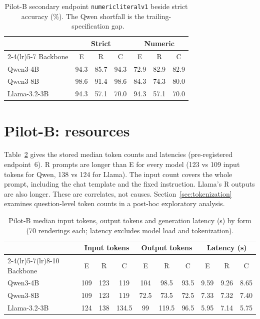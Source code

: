 \documentclass[12pt,a4paper,oneside]{report}
\renewcommand{\_}{\oldunderscore\allowbreak}
\newcommand{\rs}{\rupee}
\begin{document}
\begin{table}[t]
\centering\small
\caption{Pilot-B secondary endpoint \texttt{numeric\_literal\_v1} beside strict accuracy (\%). The Qwen shortfall is the trailing-\rs\ specification gap.}
\label{tab:numeric}
\begin{tabular}{@{}lcccccc@{}}
\toprule
 & \multicolumn{3}{c}{Strict} & \multicolumn{3}{c}{Numeric}\\
\cmidrule(lr){2-4}\cmidrule(lr){5-7}
Backbone & E & R & C & E & R & C\\
\midrule
Qwen3-4B & 94.3 & 85.7 & 94.3 & 72.9 & 82.9 & 82.9\\
Qwen3-8B & 98.6 & 91.4 & 98.6 & 84.3 & 74.3 & 80.0\\
Llama-3.2-3B & 94.3 & 57.1 & 70.0 & 94.3 & 57.1 & 70.0\\
\bottomrule
\end{tabular}
\end{table}

\section{Pilot-B: resources}

Table~\ref{tab:resources} gives the stored median token counts and latencies (pre-registered endpoint~6). R prompts are longer than E for every model (123 vs 109 input tokens for Qwen, 138 vs 124 for Llama). The input count covers the whole prompt, including the chat template and the fixed instruction. Llama's R outputs are also longer. These are correlates, not causes. Section~\ref{sec:tokenization} examines question-level token counts in a post-hoc exploratory analysis.

\begin{table}[t]
\centering\small
\caption{Pilot-B median input tokens, output tokens and generation latency (s) by form (70 renderings each; latency excludes model load and tokenization).}
\label{tab:resources}
\begin{tabular}{@{}lccccccccc@{}}
\toprule
 & \multicolumn{3}{c}{Input tokens} & \multicolumn{3}{c}{Output tokens} & \multicolumn{3}{c}{Latency (s)}\\
\cmidrule(lr){2-4}\cmidrule(lr){5-7}\cmidrule(lr){8-10}
Backbone & E & R & C & E & R & C & E & R & C\\
\midrule
Qwen3-4B & 109 & 123 & 119 & 104 & 98.5 & 93.5 & 9.59 & 9.26 & 8.65\\
Qwen3-8B & 109 & 123 & 119 & 72.5 & 73.5 & 72.5 & 7.33 & 7.32 & 7.40\\
Llama-3.2-3B & 124 & 138 & 134.5 & 99 & 119.5 & 96.5 & 5.95 & 7.14 & 5.75\\
\bottomrule
\end{tabular}
\end{table}
\end{document}
